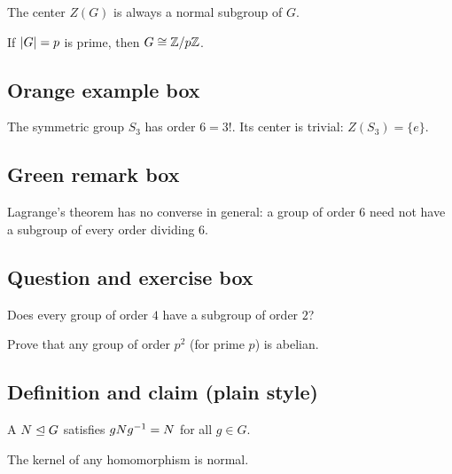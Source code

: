 \documentclass[11pt]{scrartcl}
\begin{document}
\begin{proposition}
    The center $Z(G)$ is always a normal subgroup of $G$.
\end{proposition}

\begin{corollary}
    If $\left\lvert G \right\rvert = p$ is prime, then $G \cong \mathbb{Z}/p\mathbb{Z}$.
\end{corollary}

\subsection{Orange example box}

\begin{example}
    The symmetric group $S_3$ has order $6 = 3!$. Its center is trivial:
    $Z(S_3) = \{e\}$.
\end{example}

\subsection{Green remark box}

\begin{remark}
    Lagrange's theorem has no converse in general: a group of order $6$
    need not have a subgroup of every order dividing $6$.
\end{remark}

\subsection{Question and exercise box}

\begin{ques}
    Does every group of order $4$ have a subgroup of order $2$?
\end{ques}

\begin{exercise}
    Prove that any group of order $p^2$ (for prime $p$) is abelian.
\end{exercise}

\subsection{Definition and claim (plain style)}

\begin{definition}
    A  $N \trianglelefteq G$ satisfies $gNg^{-1} = N$
    for all $g \in G$.
\end{definition}

\begin{claim}
    The kernel of any homomorphism is normal.
\end{claim}
\end{document}
